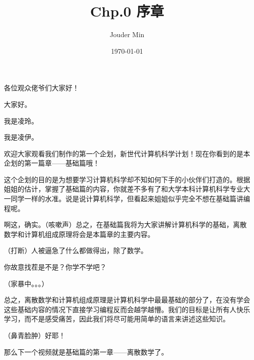 \documentclass{script}
\title{\textbf{Chp.0 序章}}
\author{Jouder Min}
\date{\today}
\begin{document}
\maketitle
\setlength{\parskip}{1em}
\begin{description}[itemsep=1ex,leftmargin=0.92cm]
    \item[凌玲] 各位观众佬爷们大家好！
    \item[凌伊] 大家好。
    \item[凌玲] 我是凌玲。
    \item[凌伊] 我是凌伊。
    \item[凌玲] 欢迎大家观看我们制作的第一个企划，新世代计算机科学计划！现在你看到的是本企划的第一篇章——基础篇哦！
    \item[凌伊] 这个企划的目的是为想要学习计算机科学却不知如何下手的小伙伴们打造的。根据姐姐的估计，掌握了基础篇的内容，你就差不多有了和大学本科计算机科学专业大一同学一样的水准。说是说计算机科学，但看起来姐姐似乎完全不想在基础篇讲编程呢。
    \item[凌玲] 啊这，确实。（{\textsf{咳嗽声}}）总之，在基础篇我将为大家讲解计算机科学的基础，离散数学和计算机组成原理将会是本篇章的主要内容。
    \item[凌伊] （{\textsf{打断}}）人被逼急了什么都做得出，除了数学。
    \item[凌玲] 你故意找茬是不是？你学不学吧？
    \item[] （{\textsf{家暴中。。。}}）
    \item[凌玲] 总之，离散数学和计算机组成原理是计算机科学中最最基础的部分了，在没有学会这些基础内容的情况下直接学习编程反而会越学越懵。我们的目标是让所有人快乐学习，而不是感受痛苦，因此我们将尽可能用简单的语言来讲述这些知识。
    \item[凌伊] （{\textsf{鼻青脸肿}}）好耶！
    \item[凌玲] 那么下一个视频就是基础篇的第一章——离散数学了。
\end{description}
\end{document}
